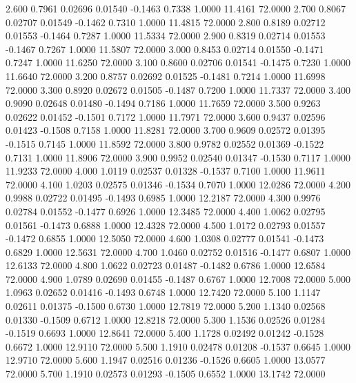    2.600   0.7961   0.02696   0.01540  -0.1463   0.7338   1.0000  11.4161  72.0000
   2.700   0.8067   0.02707   0.01549  -0.1462   0.7310   1.0000  11.4815  72.0000
   2.800   0.8189   0.02712   0.01553  -0.1464   0.7287   1.0000  11.5334  72.0000
   2.900   0.8319   0.02714   0.01553  -0.1467   0.7267   1.0000  11.5807  72.0000
   3.000   0.8453   0.02714   0.01550  -0.1471   0.7247   1.0000  11.6250  72.0000
   3.100   0.8600   0.02706   0.01541  -0.1475   0.7230   1.0000  11.6640  72.0000
   3.200   0.8757   0.02692   0.01525  -0.1481   0.7214   1.0000  11.6998  72.0000
   3.300   0.8920   0.02672   0.01505  -0.1487   0.7200   1.0000  11.7337  72.0000
   3.400   0.9090   0.02648   0.01480  -0.1494   0.7186   1.0000  11.7659  72.0000
   3.500   0.9263   0.02622   0.01452  -0.1501   0.7172   1.0000  11.7971  72.0000
   3.600   0.9437   0.02596   0.01423  -0.1508   0.7158   1.0000  11.8281  72.0000
   3.700   0.9609   0.02572   0.01395  -0.1515   0.7145   1.0000  11.8592  72.0000
   3.800   0.9782   0.02552   0.01369  -0.1522   0.7131   1.0000  11.8906  72.0000
   3.900   0.9952   0.02540   0.01347  -0.1530   0.7117   1.0000  11.9233  72.0000
   4.000   1.0119   0.02537   0.01328  -0.1537   0.7100   1.0000  11.9611  72.0000
   4.100   1.0203   0.02575   0.01346  -0.1534   0.7070   1.0000  12.0286  72.0000
   4.200   0.9988   0.02722   0.01495  -0.1493   0.6985   1.0000  12.2187  72.0000
   4.300   0.9976   0.02784   0.01552  -0.1477   0.6926   1.0000  12.3485  72.0000
   4.400   1.0062   0.02795   0.01561  -0.1473   0.6888   1.0000  12.4328  72.0000
   4.500   1.0172   0.02793   0.01557  -0.1472   0.6855   1.0000  12.5050  72.0000
   4.600   1.0308   0.02777   0.01541  -0.1473   0.6829   1.0000  12.5631  72.0000
   4.700   1.0460   0.02752   0.01516  -0.1477   0.6807   1.0000  12.6133  72.0000
   4.800   1.0622   0.02723   0.01487  -0.1482   0.6786   1.0000  12.6584  72.0000
   4.900   1.0789   0.02690   0.01455  -0.1487   0.6767   1.0000  12.7008  72.0000
   5.000   1.0963   0.02652   0.01416  -0.1493   0.6748   1.0000  12.7420  72.0000
   5.100   1.1147   0.02611   0.01375  -0.1500   0.6730   1.0000  12.7819  72.0000
   5.200   1.1340   0.02568   0.01330  -0.1509   0.6712   1.0000  12.8218  72.0000
   5.300   1.1536   0.02526   0.01284  -0.1519   0.6693   1.0000  12.8641  72.0000
   5.400   1.1728   0.02492   0.01242  -0.1528   0.6672   1.0000  12.9110  72.0000
   5.500   1.1910   0.02478   0.01208  -0.1537   0.6645   1.0000  12.9710  72.0000
   5.600   1.1947   0.02516   0.01236  -0.1526   0.6605   1.0000  13.0577  72.0000
   5.700   1.1910   0.02573   0.01293  -0.1505   0.6552   1.0000  13.1742  72.0000
